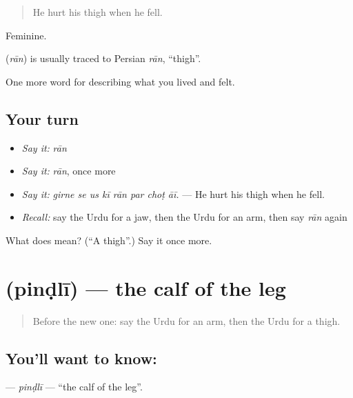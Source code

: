 \begin{quote}
He hurt his thigh when he fell.
\end{quote}

Feminine.

\begin{cousinweb}
\textbf{} (\emph{rān}) is usually traced to Persian \emph{rān}, \textquotedblleft{}thigh\textquotedblright{}.
\end{cousinweb}

\begin{grammarlens}[title={What you've built}]
One more word for describing what you lived and felt.
\end{grammarlens}

\subsection*{Your turn}
\begin{itemize}
\raggedright
  \item \emph{Say it:} \emph{rān}
  \item \emph{Say it:} \emph{rān}, once more
  \item \emph{Say it:} \emph{girne se us kī rān par choṭ āī.} — He hurt his thigh when he fell.
  \item \emph{Recall:} say the Urdu for a jaw, then the Urdu for an arm, then say \emph{rān} again
\end{itemize}

\begin{tcolorbox}[breakable,colback=teal!4,colframe=teal!35!black,title={Before you move on}]
What does  mean? (\textquotedblleft{}A thigh\textquotedblright{}.) Say it once more.
\end{tcolorbox}
\section[\texorpdfstring{\ur{پنڈلی} (pinḍlī)}{پنڈلی (pinḍlī)}]{ (pinḍlī) — the calf of the leg}

\label{lesson:UR-C466-pindli}



\begin{quote}
Before the new one: say the Urdu for an arm, then the Urdu for a thigh.
\end{quote}

\subsection*{You'll want to know: }
\textbf{} — \emph{pinḍlī} — \textquotedblleft{}the calf of the leg\textquotedblright{}.


